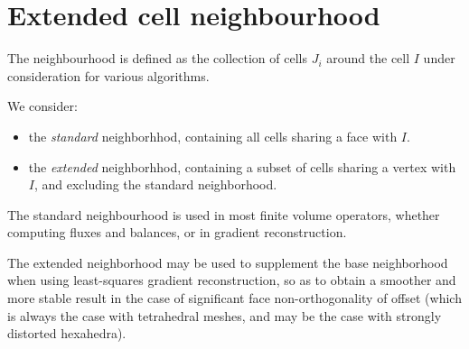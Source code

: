 
%
%
%
%


\nopagebreak

\section{Extended cell neighbourhood}

The neighbourhood is defined as the collection of cells $J_i$ around the
cell $I$ under consideration for various algorithms.

We consider:

\begin{itemize}
  \item the \emph{standard} neighborhhod, containing all cells sharing
        a face with $I$.
  \item the \emph{extended} neighborhhod, containing a subset of cells sharing
        a vertex with $I$, and excluding the standard neighborhood.
\end{itemize}

The standard neighbourhood is used in most finite volume operators, whether
computing fluxes and balances, or in gradient reconstruction.

The extended neighborhood may be used to supplement the base neighborhood
when using least-squares gradient reconstruction, so as to obtain a smoother
and more stable result in the case of significant face non-orthogonality
of offset (which is always the case with tetrahedral meshes, and may be the
case with strongly distorted hexahedra).

